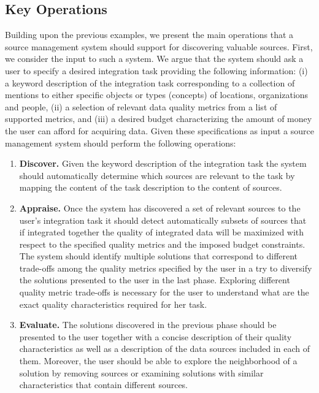 \documentclass{sig-alternate}
\begin{document}
\subsection{Key Operations}
\label{sec:operations}
Building upon the previous examples, we present the main operations that a source management system should support for discovering valuable sources.  First, we consider the input to such a system. We argue that the system should ask a user to specify a desired integration task providing the following information: (i) a keyword description of the integration task corresponding to a collection of mentions to either specific objects or types (concepts) of locations, organizations and people, (ii) a selection of relevant data quality metrics from a list of supported metrics, and (iii) a desired budget characterizing the amount of money the user can afford for acquiring data. Given these specifications as input  a source management system should perform the following operations:
\begin{enumerate}
\item {\bf Discover.} Given the keyword description of the integration task the system should automatically determine which sources are relevant to the task by mapping the content of the task description to the content of sources.
\item {\bf Appraise.} Once the system has discovered a set of relevant sources to the user's integration task it should detect automatically subsets of sources that if integrated together the quality of integrated data will be maximized with respect to the specified quality metrics and the imposed budget constraints. The system should identify multiple solutions that correspond to different trade-offs among the quality metrics specified by the user in a try to diversify the solutions presented to the user in the last phase. Exploring different quality metric trade-offs is necessary for the user to understand what are the exact quality characteristics required for her task.
\item {\bf Evaluate.} The solutions discovered in the previous phase should be presented to the user together with a concise description of their quality characteristics as well as a description of the data sources included in each of them. Moreover, the user should be able to explore the neighborhood of a solution by removing sources or examining solutions with similar characteristics that contain different sources.
\end{enumerate}
\end{document}
